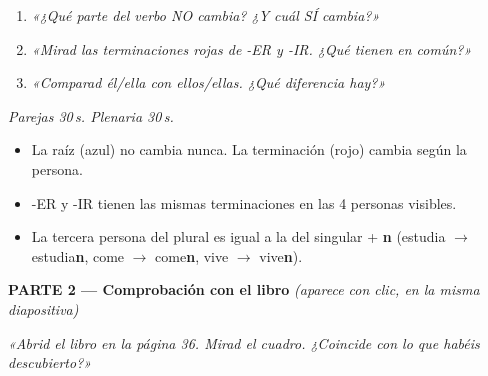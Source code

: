 \documentclass[a4paper,10pt]{article}
\begin{document}
\begin{enumerate}[leftmargin=2em, itemsep=6pt]
\item \begin{preguntabox}
\textit{«¿Qué parte del verbo NO cambia? ¿Y cuál SÍ cambia?»}
\end{preguntabox}

\item \begin{preguntabox}
\textit{«Mirad las terminaciones rojas de -ER y -IR. ¿Qué tienen en común?»}
\end{preguntabox}

\item \begin{preguntabox}
\textit{«Comparad él/ella con ellos/ellas. ¿Qué diferencia hay?»}
\end{preguntabox}
\end{enumerate}

\vspace{0.2cm}

{\small\textit{Parejas 30\,s. Plenaria 30\,s.}}

\begin{estrategiabox}
{\small
\begin{itemize}[leftmargin=1.2em, itemsep=2pt]
\item La raíz (\textcolor{azulraiz}{azul}) no cambia nunca. La terminación (\textcolor{rojofinal}{rojo}) cambia según la persona.
\item -ER y -IR tienen las mismas terminaciones en las 4 personas visibles.
\item La tercera persona del plural es igual a la del singular + \textbf{n} (estudia $\rightarrow$ estudia\textbf{n}, come $\rightarrow$ come\textbf{n}, vive $\rightarrow$ vive\textbf{n}).
\end{itemize}
}
\end{estrategiabox}

\newpage


\noindent\textcolor{azulprincipal}{\textbf{\large PARTE 2 — Comprobación con el libro}} {\small\textit{(aparece con clic, en la misma diapositiva)}}

\vspace{0.3cm}

\begin{preguntabox}
\centering\large\textit{«Abrid el libro en la página 36. Mirad el cuadro. ¿Coincide con lo que habéis descubierto?»}
\end{preguntabox}
\end{document}
